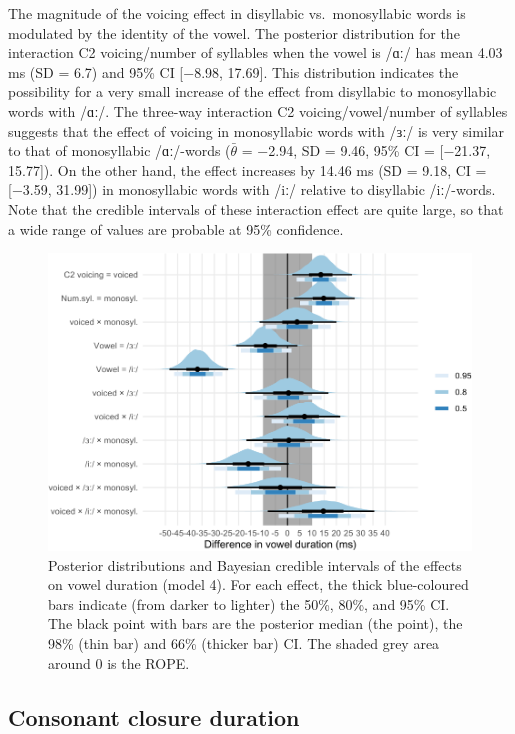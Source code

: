 \documentclass[12pt,a4paper,]{article}
\begin{document}
The magnitude of the voicing effect in disyllabic vs.~monosyllabic words
is modulated by the identity of the vowel. The posterior distribution
for the interaction C2 voicing/number of syllables when the vowel is
/ɑː/ has mean 4.03 ms (SD = 6.7) and 95\% CI {[}−8.98, 17.69{]}. This
distribution indicates the possibility for a very small increase of the
effect from disyllabic to monosyllabic words with /ɑː/. The three-way
interaction C2 voicing/vowel/number of syllables suggests that the
effect of voicing in monosyllabic words with /ɜː/ is very similar to
that of monosyllabic /ɑː/-words (\(\bar{\theta}\) = −2.94, SD = 9.46,
95\% CI = {[}−21.37, 15.77{]}). On the other hand, the effect increases
by 14.46 ms (SD = 9.18, CI = {[}−3.59, 31.99{]}) in monosyllabic words
with /iː/ relative to disyllabic /iː/-words. Note that the credible
intervals of these interaction effect are quite large, so that a wide
range of values are probable at 95\% confidence.

\begin{figure}
\includegraphics[width=\linewidth]{2019-english-rr_files/figure-latex/vow-4-intervals-1} \caption{Posterior distributions and Bayesian credible intervals of the effects on vowel duration (model 4). For each effect, the thick blue-coloured bars indicate (from darker to lighter) the 50\%, 80\%, and 95\% CI. The black point with bars are the posterior median (the point), the 98\% (thin bar) and 66\% (thicker bar) CI. The shaded grey area around 0 is the ROPE.}\label{f:vow-4-intervals}
\end{figure}

\hypertarget{consonant-closure-duration}{%
\subsection{Consonant closure
duration}\label{consonant-closure-duration}}
\end{document}
